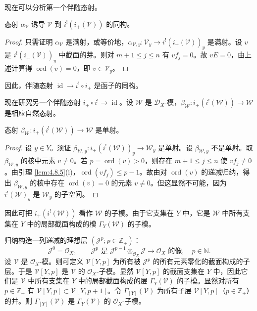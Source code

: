 现在可以分析第一个伴随态射。

\begin{lemma}\label{lem:4.8.6}
态射 $\alpha_{\mathcal{V}}$ 诱导 $\mathcal{V}$ 到 $i^!(i_+(\mathcal{V}))$ 的同构。
\end{lemma}

\begin{proof}
只需证明 $\alpha_{\mathcal{V}}$ 是满射，或等价地，$\alpha_{\mathcal{V},y}:\mathcal{V}_y\to i^!(i_+(\mathcal{V}))_y$ 是满射。设 $v$ 是 $i^!(i_+(\mathcal{V}))_y$ 中截面的芽。则对 $m+1\le j\le n$ 有 $vf_j=0$。故 $vE=0$，由上述计算得 $\operatorname{ord}(v)=0$，即 $v\in\mathcal{V}_y$。
\end{proof}

因此，伴随态射 $\operatorname{id}\to i^!\circ i_+$ 是函子的同构。

现在研究另一个伴随态射 $i_+\circ i^!\to\operatorname{id}$。设 $\mathcal{W}$ 是 $\mathcal{D}_X$-模，$\beta_{\mathcal{W}}:i_+(i^!(\mathcal{W}))\to\mathcal{W}$ 是相应自然态射。

\begin{lemma}\label{lem:4.8.7}
态射 $\beta_{\mathcal{W}}:i_+(i^!(\mathcal{W}))\to\mathcal{W}$ 是单射。
\end{lemma}

\begin{proof}
设 $y\in Y$。须证 $\beta_{\mathcal{W},y}:i_+(i^!(\mathcal{W}))_y\to\mathcal{W}_y$ 是单射。设 $\beta_{\mathcal{W},y}$ 不是单射。取 $\beta_{\mathcal{W},y}$ 的核中元素 $v\ne0$。若 $p=\operatorname{ord}(v)>0$，则存在 $m+1\le j\le n$ 使 $vf_j\ne0$。由引理 \ref{lem:4.8.5}(i)，$\operatorname{ord}(vf_j)\le p-1$。故由对 $\operatorname{ord}(v)$ 的递减归纳，得出 $\beta_{\mathcal{W},y}$ 的核中存在 $\operatorname{ord}(v)=0$ 的元素 $v\ne0$。但这显然不可能，因为 $i^!(\mathcal{W})_y$ 是 $\mathcal{W}_y$ 的子空间。
\end{proof}

因此可把 $i_+(i^!(\mathcal{W}))$ 看作 $\mathcal{W}$ 的子模。由于它支集在 $Y$ 中，它是 $\mathcal{W}$ 中所有支集在 $Y$ 中的局部截面构成的模 $\Gamma_Y(\mathcal{W})$ 的子模。

归纳构造一列递减的理想层 $(\mathcal{J}^p;p\in\mathbb{Z}_+)$：
$$\mathcal{J}^0=\mathcal{O}_X,\qquad \mathcal{J}^p\text{ 是 }\mathcal{J}^{p-1}\otimes_{\mathcal{O}_X}\mathcal{J}\to\mathcal{O}_X\text{ 的像},\quad p\in\mathbb{N}.$$
设 $\mathcal{V}$ 是 $\mathcal{O}_X$-模。则可定义 $\mathcal{V}[Y,p]$ 为所有被 $\mathcal{J}^p$ 的所有元素零化的截面构成的子层。于是 $\mathcal{V}[Y,p]$ 是 $\mathcal{V}$ 的 $\mathcal{O}_X$-子模。显然 $\mathcal{V}[Y,p]$ 的截面支集在 $Y$ 中，因此它们是 $\mathcal{V}$ 中所有支集在 $Y$ 中的局部截面构成的层 $\Gamma_Y(\mathcal{V})$ 的子模。显然对所有 $p\in\mathbb{Z}_+$ 有 $\mathcal{V}[Y,p]\subset\mathcal{V}[Y,p+1]$。令 $\Gamma_{[Y]}(\mathcal{V})$ 为所有子层 $\mathcal{V}[Y,p]$（$p\in\mathbb{Z}_+$）的并。则 $\Gamma_{[Y]}(\mathcal{V})$ 是 $\Gamma_Y(\mathcal{V})$ 的 $\mathcal{O}_X$-子模。

